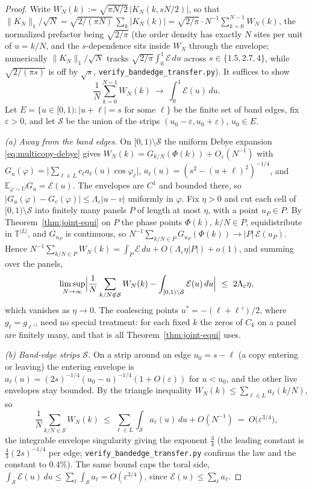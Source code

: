 \begin{proof}
Write $W_N(k):=\sqrt{\pi N/2}\,|K_N(k,sN/2)|$, so that $\|K_N\|_1/\sqrt N=\sqrt{2/(\pi N)}\,\sum_k|K_N(k)|
=\sqrt{2/\pi}\cdot N^{-1}\sum_{k=0}^{N-1}W_N(k)$, the normalized prefactor being $\sqrt{2/\pi}$ (the order
density has exactly $N$ sites per unit of $u=k/N$, and the $s$-dependence sits inside $W_N$ through the
envelope; numerically $\|K_N\|_1/\sqrt N$ tracks $\sqrt{2/\pi}\int_0^1\mathcal E\,du$ across $s\in\{1.5,2.7,4\}$,
while $\sqrt{2/(\pi s)}$ is off by $\sqrt s$, \texttt{verify\_bandedge\_transfer.py}). It suffices to show
\begin{equation}\label{eq:transfer-target}
  \frac1N\sum_{k=0}^{N-1}W_N(k)\ \longrightarrow\ \int_0^1\mathcal E(u)\,du .
\end{equation}
Let $E=\{u\in[0,1):|u+\ell|=s\text{ for some }\ell\}$ be the finite set of band edges, fix $\varepsilon>0$, and
let $\mathcal S$ be the union of the strips $(u_0-\varepsilon,u_0+\varepsilon)$, $u_0\in E$.

\emph{(a) Away from the band edges.} On $[0,1)\setminus\mathcal S$ the uniform Debye expansion
\eqref{eq:multicopy-debye} gives $W_N(k)=G_{k/N}(\Phi(k))+O_\varepsilon(N^{-1})$ with
$G_u(\varphi)=\bigl|\sum_{\ell\in L}c_\ell a_\ell(u)\cos\varphi_\ell\bigr|$, $a_\ell(u)=(s^2-(u+\ell)^2)^{-1/4}$, and
$\mathbb E_{\varphi\sim U}G_u=\mathcal E(u)$. The envelopes are $C^1$ and bounded there, so
$|G_u(\varphi)-G_v(\varphi)|\le\Lambda_\varepsilon|u-v|$ uniformly in $\varphi$. Fix $\eta>0$ and cut each cell of
$[0,1)\setminus\mathcal S$ into finitely many panels $P$ of length at most $\eta$, with a point $u_P\in P$. By
Theorem~\ref{thm:joint-equi} on $P$ the phase points $\Phi(k)$, $k/N\in P$, equidistribute in
$\mathbb T^{|L|}$, and $G_{u_P}$ is continuous, so $N^{-1}\sum_{k/N\in P}G_{u_P}(\Phi(k))\to|P|\,\mathcal E(u_P)$.
Hence $N^{-1}\sum_{k/N\in P}W_N(k)=\int_P\mathcal E\,du+O(\Lambda_\varepsilon\eta|P|)+o(1)$, and summing over the
panels,
\[
  \limsup_{N\to\infty}\Bigl|\frac1N\sum_{k/N\notin\mathcal S}W_N(k)-\int_{[0,1)\setminus\mathcal S}\mathcal E(u)\,du\Bigr|
  \ \le\ 2\Lambda_\varepsilon\eta ,
\]
which vanishes as $\eta\to0$. The coalescing points $u^*=-(\ell+\ell')/2$, where $g_\ell=g_{\ell'}$, need no
special treatment: for each fixed $k$ the zeros of $C_k$ on a panel are finitely many, and that is all
Theorem~\ref{thm:joint-equi} uses.

\emph{(b) Band-edge strips $\mathcal S$.} On a strip around an edge $u_0=s-\ell$ (a copy entering or
leaving) the entering envelope is $a_\ell(u)=(2s)^{-1/4}(u_0-u)^{-1/4}(1+O(\varepsilon))$ for $u<u_0$, and the
other live envelopes stay bounded. By the triangle inequality $W_N(k)\le\sum_{\ell\in L}a_\ell(k/N)$, so
\[
  \frac1N\sum_{k/N\in\mathcal S}W_N(k)\ \le\ \sum_{\ell\in L}\int_{\mathcal S}a_\ell(u)\,du+O(N^{-1})
  \ =\ O\bigl(\varepsilon^{3/4}\bigr),
\]
the integrable envelope singularity giving the exponent $\tfrac34$ (the leading constant is
$\tfrac43(2s)^{-1/4}$ per edge; \texttt{verify\_bandedge\_transfer.py} confirms the law and the constant to
$0.4\%$). The same bound caps the toral side, $\int_{\mathcal S}\mathcal E(u)\,du\le\sum_\ell\int_{\mathcal S}a_\ell
=O(\varepsilon^{3/4})$, since $\mathcal E(u)\le\sum_\ell a_\ell$.


\end{proof}
